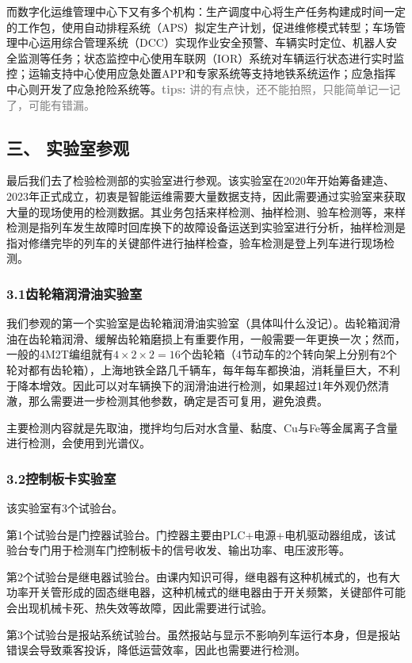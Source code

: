 \documentclass[12pt, oneside, a4paper]{ctexart}
\begin{document}
\newpage
\journalpage\par{}
而数字化运维管理中心下又有多个机构：生产调度中心将生产任务构建成时间一定的工作包，使用自动排程系统（APS）拟定生产计划，促进维修模式转型；车场管理中心运用综合管理系统（DCC）实现作业安全预警、车辆实时定位、机器人安全监测等任务；状态监控中心使用车联网（IOR）系统对车辆运行状态进行实时监控；运输支持中心使用应急处置APP和专家系统等支持地铁系统运作；应急指挥中心则开发了应急抢险系统等。\textcolor{gray}{{\bf{}tips: }讲的有点快，还不能拍照，只能简单记一记了，可能有错漏。}\par{}
\vspace{-5mm}\subsection*{三、 实验室参观}\vspace{-2mm}
最后我们去了检验检测部的实验室进行参观。该实验室在2020年开始筹备建造、2023年正式成立，初衷是智能运维需要大量数据支持，因此需要通过实验室来获取大量的现场使用的检测数据。其业务包括来样检测、抽样检测、验车检测等，来样检测是指列车发生故障时回库换下的故障设备运送到实验室进行分析，抽样检测是指对修缮完毕的列车的关键部件进行抽样检查，验车检测是登上列车进行现场检测。\par{}
\vspace{-5mm}\subsubsection*{3.1\quad{}齿轮箱润滑油实验室}\vspace{-2mm}
我们参观的第一个实验室是齿轮箱润滑油实验室（具体叫什么没记）。齿轮箱润滑油在齿轮箱润滑、缓解齿轮箱磨损上有重要作用，一般需要一年更换一次；然而，一般的4M2T编组就有$4 \times 2 \times 2 = 16$个齿轮箱（4节动车的2个转向架上分别有2个轮对都有齿轮箱），上海地铁全路几千辆车，每年每车都换油，消耗量巨大，不利于降本增效。因此可以对车辆换下的润滑油进行检测，如果超过1年外观仍然清澈，那么需要进一步检测其他参数，确定是否可复用，避免浪费。\par{}
主要检测内容就是先取油，搅拌均匀后对水含量、黏度、Cu与Fe等金属离子含量进行检测，会使用到光谱仪。\par{}
\vspace{-5mm}\subsubsection*{3.2\quad{}控制板卡实验室}\vspace{-2mm}
该实验室有3个试验台。\par{}
第1个试验台是门控器试验台。门控器主要由$\mathrm{PLC}$+电源+电机驱动器组成，该试验台专门用于检测车门控制板卡的信号收发、输出功率、电压波形等。\par{}
第2个试验台是继电器试验台。由课内知识可得，继电器有这种机械式的，也有大功率开关管形成的固态继电器，这种机械式的继电器由于开关频繁，关键部件可能会出现机械卡死、热失效等故障，因此需要进行试验。\par{}
第3个试验台是报站系统试验台。虽然报站与显示不影响列车运行本身，但是报站错误会导致乘客投诉，降低运营效率，因此也需要进行检测。\par{}
\end{document}
